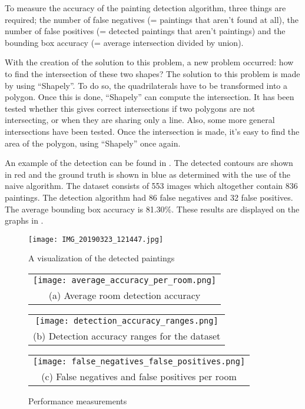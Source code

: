 To measure the accuracy of the painting detection algorithm, three things are required; the number of false negatives (= paintings that aren't found at all), the number of false positives (= detected paintings that aren't paintings) and the bounding box accuracy (= average intersection divided by union).

With the creation of the solution to this problem, a new problem occurred: how to find the intersection of these two shapes? The solution to this problem is made by using ``Shapely''. To do so, the quadrilaterals have to be transformed into a polygon. Once this is done, ``Shapely'' can compute the intersection. It has been tested whether this gives correct intersections if two polygons are not intersecting, or when they are sharing only a line. Also, some more general intersections have been tested. Once the intersection is made, it's easy to find the area of the polygon, using ``Shapely'' once again.

An example of the detection can be found in . The detected contours are shown in red and the ground truth is shown in blue as determined with the use of the naive algorithm. The dataset consists of 553 images which altogether contain 836 paintings. The detection algorithm had 86 false negatives and 32 false positives. The average bounding box accuracy is 81.30\%. These results are displayed on the graphs in .

\begin{figure}[ht]
    \texttt{[image: IMG\_20190323\_121447.jpg]}
    \centering
    \caption{A visualization of the detected paintings}
    \label{fig:paiting_detection_with_ground_truth}
\end{figure}

\begin{figure}
    \centering
    \begin{tabular}{@{}c@{}}
        \texttt{[image: average\_accuracy\_per\_room.png]} \\[\abovecaptionskip]
        \small (a) Average room detection accuracy
    \end{tabular}

    \vspace{\floatsep}

    \begin{tabular}{@{}c@{}}
        \texttt{[image: detection\_accuracy\_ranges.png]} \\[\abovecaptionskip]
        \small (b) Detection accuracy ranges for the dataset
    \end{tabular}

    \begin{tabular}{@{}c@{}}
        \texttt{[image: false\_negatives\_false\_positives.png]} \\[\abovecaptionskip]
        \small (c) False negatives and false positives per room
    \end{tabular}

    \caption{Performance measurements}
    \label{fig:performance-measurements}
\end{figure}

